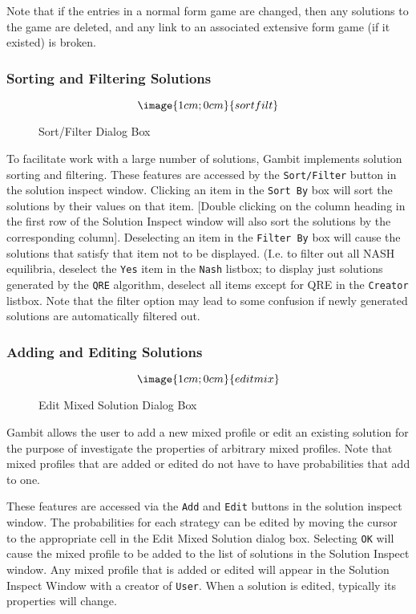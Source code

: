 {Note that if the entries in a normal form game are changed, then any solutions 
to the game are deleted, and any link to an associated extensive form 
game (if it existed) is broken.  


\subsubsection{Sorting and Filtering Solutions}\label{SolnSortFilt}
\begin{figure}
$$\image{1cm;0cm}{sortfilt}$$
\caption{Sort/Filter Dialog Box}\label{fig_nfgsortfilt}
\end{figure}

To facilitate work with a large number of solutions, Gambit implements solution
sorting and filtering.  These features are accessed by the {\tt Sort/Filter} button
in the solution inspect window.  Clicking an item in the {\tt Sort By} box will 
sort the solutions by their values on that item.   
[Double clicking on the column heading in the first row of the Solution Inspect 
window will also sort the solutions by the corresponding column].  
Deselecting an item in the 
{\tt Filter By} box will cause the solutions that satisfy that item not to
be displayed.  (I.e. to filter out all NASH equilibria, deselect the {\tt Yes} item
in the {\tt Nash} listbox; to display just solutions generated by the {\tt QRE}
 algorithm, deselect all items except for QRE in the {\tt Creator} listbox.
Note that the filter option may lead to some confusion if newly generated 
solutions are automatically filtered out.

\subsubsection{Adding and Editing Solutions}\label{SolnAddEdit}
\begin{figure}
$$\image{1cm;0cm}{editmix}$$
\caption{Edit Mixed Solution Dialog Box}\label{fig_nfgsortfilt}
\end{figure}

Gambit allows the user to add a new mixed profile or edit an existing 
solution for the purpose of investigate the properties of 
arbitrary mixed profiles.  Note that mixed profiles that are 
added or edited do not have to have probabilities that add to one. 

These features are accessed via the {\tt Add} and {\tt Edit} buttons in the 
solution inspect window.  The probabilities 
for each strategy can be edited by moving the cursor to the appropriate cell   
in the Edit Mixed Solution dialog box.  Selecting {\tt OK} 
will cause the mixed profile to be added to the list of solutions 
in the Solution Inspect window.  
Any mixed profile that is added or edited will appear in the 
Solution Inspect Window with a creator of {\tt User}.  When a solution is 
edited, typically its properties will change.  

}

